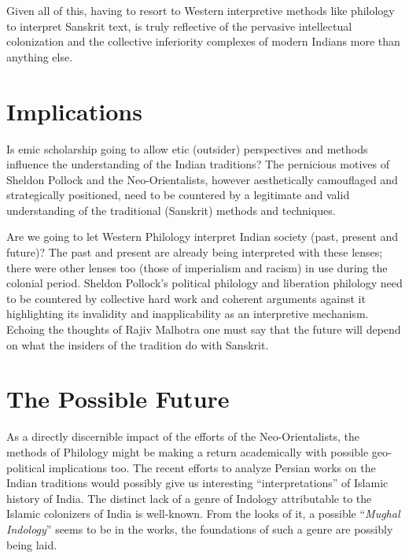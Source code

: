 Given all of this, having to resort to Western interpretive methods like philology to interpret Sanskrit text, is truly reflective of the pervasive intellectual colonization and the collective inferiority complexes of modern Indians more than anything else.


\section*{Implications}

Is emic scholarship going to allow etic (outsider) perspectives and methods influence the understanding of the Indian traditions? The pernicious motives of Sheldon Pollock and the Neo-Orientalists, however aesthetically camouflaged and strategically positioned, need to be countered by a legitimate and valid understanding of the traditional (Sanskrit) methods and techniques.

Are we going to let Western Philology interpret Indian society (past, present and future)? The past and present are already being interpreted with these lenses; there were other lenses too (those of imperialism and racism) in use during the colonial period. Sheldon Pollock’s political philology and liberation philology need to be countered by collective hard work and coherent arguments against it highlighting its invalidity and inapplicability as an interpretive mechanism. Echoing the thoughts of Rajiv Malhotra one must say that the future will depend on what the insiders of the tradition do with Sanskrit.

\newpage

\section*{The Possible Future}

As a directly discernible impact of the efforts of the Neo-Orientalists, the methods of Philology might be making a return academically with possible geo-political implications too. The recent efforts to analyze Persian works on the Indian traditions would possibly give us interesting “interpretations” of Islamic history of India. The distinct lack of a genre of Indology attributable to the Islamic colonizers of India is well-known. From the looks of it, a possible “\textit{Mughal Indology}” seems to be in the works, the foundations of such a genre are possibly being laid.

